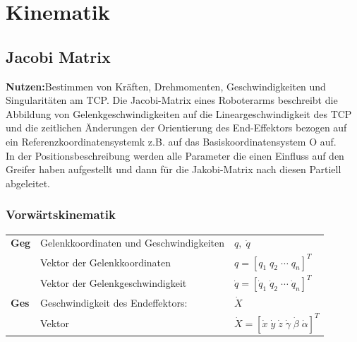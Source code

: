 
\section{Kinematik}
\subsection{Jacobi Matrix  }
\textbf{Nutzen:}Bestimmen von Kräften, Drehmomenten, Geschwindigkeiten und Singularitäten am TCP.\newline
Die Jacobi-Matrix eines Roboterarms beschreibt die Abbildung von
Gelenkgeschwindigkeiten auf die Lineargeschwindigkeit des TCP
und die zeitlichen Änderungen der Orientierung des End-Effektors
bezogen auf ein Referenzkoordinatensystemk z.B. auf das
Basiskoordinatensystem O auf. \\
In der Positionsbeschreibung werden alle Parameter die einen Einfluss 
auf den Greifer haben aufgestellt und dann für die Jakobi-Matrix nach diesen Partiell abgeleitet.

\subsubsection{Vorwärtskinematik}
\vspace{-0.5cm}	
\begin{tabular}{lll}
    \textbf{Geg}&Gelenkkoordinaten und Geschwindigkeiten&$q,\; \dot{q}$\\
    &Vektor der Gelenkkoordinaten&$ q = \left[ q_1\; q_2 \;  \cdots \;  q_n\right]^T$\\
    &Vektor der Gelenkgeschwindigkeit&$ \dot{q} = \left[\dot{q}_1\; \dot{q}_2\; \cdots\;  \dot{q}_n \right]^T$\\
    \textbf{Ges}&Geschwindigkeit des Endeffektors:&$\dot{X}$\\
    &Vektor&$\dot{X} = [\dot{x}\; \dot{y}\; \dot{z}\;
    \dot{\gamma}\; \dot{\beta}\; \dot{\alpha}]^{T}$\\
\end{tabular}

